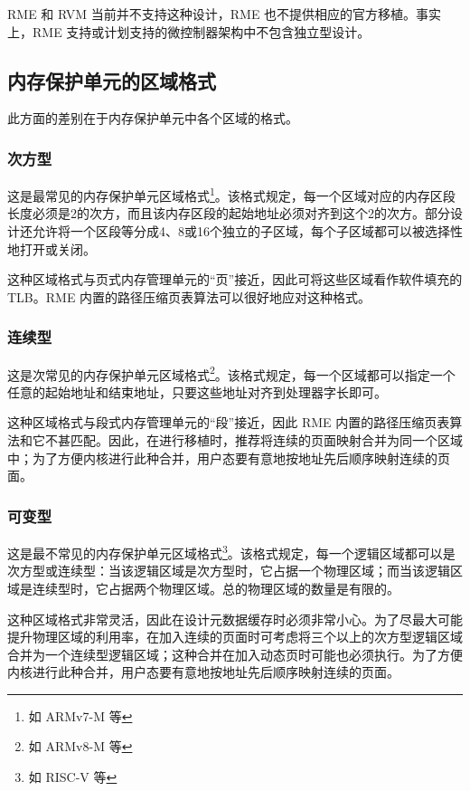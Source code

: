 RME 和 RVM 当前并不支持这种设计，RME 也不提供相应的官方移植。事实上，RME 支持或计划支持的微控制器架构中不包含独立型设计。

\subsection{内存保护单元的区域格式}\label{subsec:9-mpu-region-format}

此方面的差别在于内存保护单元中各个区域的格式。

\subsubsection{次方型}\label{subsubsec:9-mpu-power-of-two}

这是最常见的内存保护单元区域格式\footnote{如 ARMv7-M 等}。该格式规定，每一个区域对应的内存区段长度必须是2的次方，而且该内存区段的起始地址必须对齐到这个2的次方。部分设计还允许将一个区段等分成4、8或16个独立的子区域，每个子区域都可以被选择性地打开或关闭。

这种区域格式与页式内存管理单元的``页''接近，因此可将这些区域看作软件填充的 TLB。RME 内置的路径压缩页表算法可以很好地应对这种格式。

\subsubsection{连续型}\label{subsubsec:9-mpu-contiguous}

这是次常见的内存保护单元区域格式\footnote{如 ARMv8-M 等}。该格式规定，每一个区域都可以指定一个任意的起始地址和结束地址，只要这些地址对齐到处理器字长即可。

这种区域格式与段式内存管理单元的``段''接近，因此 RME 内置的路径压缩页表算法和它不甚匹配。因此，在进行移植时，推荐将连续的页面映射合并为同一个区域中；为了方便内核进行此种合并，用户态要有意地按地址先后顺序映射连续的页面。

\subsubsection{可变型}\label{subsubsec:9-mpu-variable}

这是最不常见的内存保护单元区域格式\footnote{如 RISC-V 等}。该格式规定，每一个逻辑区域都可以是次方型或连续型：当该逻辑区域是次方型时，它占据一个物理区域；而当该逻辑区域是连续型时，它占据两个物理区域。总的物理区域的数量是有限的。

这种区域格式非常灵活，因此在设计元数据缓存时必须非常小心。为了尽最大可能提升物理区域的利用率，在加入连续的页面时可考虑将三个以上的次方型逻辑区域合并为一个连续型逻辑区域；这种合并在加入动态页时可能也必须执行。为了方便内核进行此种合并，用户态要有意地按地址先后顺序映射连续的页面。

